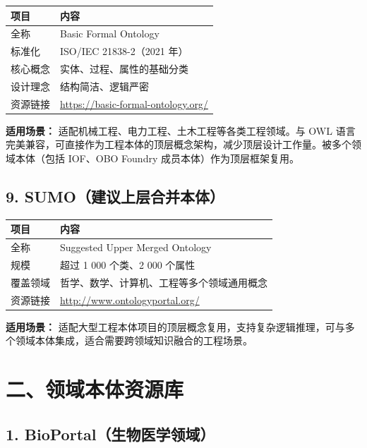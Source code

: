 \begin{center}
\begin{tabular}{@{}ll@{}}
\toprule
\textbf{项目} & \textbf{内容} \\
\midrule
全称 & Basic Formal Ontology \\
标准化 & ISO/IEC 21838-2（2021 年） \\
核心概念 & 实体、过程、属性的基础分类 \\
设计理念 & 结构简洁、逻辑严密 \\
资源链接 & \url{https://basic-formal-ontology.org/} \\
\bottomrule
\end{tabular}
\end{center}
\color{black}

\textbf{适用场景：} 适配机械工程、电力工程、土木工程等各类工程领域。与 OWL 语言完美兼容，可直接作为工程本体的顶层概念架构，减少顶层设计工作量。被多个领域本体（包括 IOF、OBO Foundry 成员本体）作为顶层框架复用。


\subsection{9. SUMO（建议上层合并本体）}

\begin{center}
\begin{tabular}{@{}ll@{}}
\toprule
\textbf{项目} & \textbf{内容} \\
\midrule
全称 & Suggested Upper Merged Ontology \\
规模 & 超过 1 000 个类、2 000 个属性 \\
覆盖领域 & 哲学、数学、计算机、工程等多个领域通用概念 \\
资源链接 & \url{http://www.ontologyportal.org/} \\
\bottomrule
\end{tabular}
\end{center}
\color{black}

\textbf{适用场景：} 适配大型工程本体项目的顶层概念复用，支持复杂逻辑推理，可与多个领域本体集成，适合需要跨领域知识融合的工程场景。


\section{二、领域本体资源库}

\subsection{1. BioPortal（生物医学领域）}

